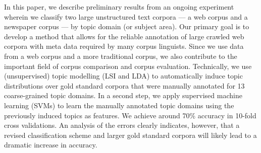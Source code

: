 In this paper, we describe preliminary results from an ongoing experiment wherein we classify two large unstructured text corpora --- a web corpus and a newspaper corpus --- by topic domain (or subject area). Our primary goal is to develop a method that allows for the reliable annotation of large crawled web corpora with meta data required by many corpus linguists. Since we use data from a web corpus and a more traditional corpus, we also contribute to the important field of corpus comparison and corpus evaluation. Technically, we use (unsupervised) topic modelling (LSI and LDA) to automatically induce topic distributions over gold standard corpora that were manually annotated for 13 coarse-grained topic domains. In a second step, we apply supervised machine learning (SVMs) to learn the manually annotated topic domains using the previously induced topics as features. We achieve around 70\% accuracy in 10-fold cross validations. An analysis of the errors clearly indicates, however, that a revised classification scheme and larger gold standard corpora will likely lead to a dramatic increase in accuracy.
